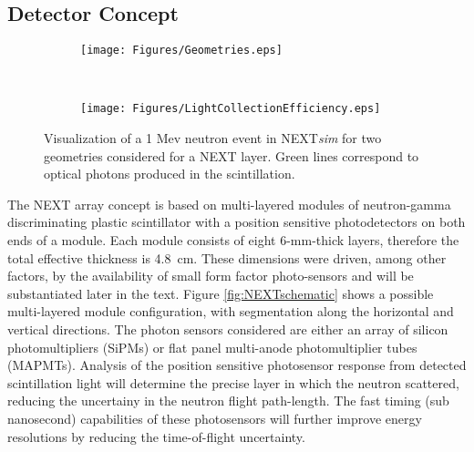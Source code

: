 \documentclass[preprint,3p,twocolumn]{elsarticle}
\begin{document}
\subsection{Detector Concept}
\begin{figure}[t]
 \centering
 \begin{subfigure}{\linewidth}
  \centering
  \texttt{[image: Figures/Geometries.eps]}
 \caption{}
 \end{subfigure}%
 \\
 \begin{subfigure}{\linewidth}
  \centering
  \texttt{[image: Figures/LightCollectionEfficiency.eps]}
  \caption{}
 \end{subfigure}%
 \caption{Visualization of a 1 Mev neutron event in NEXT\emph{sim} for two geometries considered for a NEXT layer. Green lines correspond to optical photons produced in the scintillation.}
 \label{fig:GeoEff}
\end{figure} 

The NEXT array concept is based on multi-layered modules of neutron-gamma discriminating plastic scintillator with a position sensitive photodetectors on both ends of a module. Each module consists of eight 6-mm-thick layers, therefore the total effective thickness is 4.8~cm. These dimensions were driven, among other factors, by the availability of small form factor photo-sensors and will be substantiated later in the text. Figure \ref{fig:NEXTschematic} shows a possible multi-layered module configuration, with segmentation along the horizontal and vertical directions. The photon sensors considered are either an array of silicon photomultipliers (SiPMs) or flat panel multi-anode photomultiplier tubes (MAPMTs). Analysis of the position sensitive photosensor response from detected scintillation light will determine the precise layer in which the neutron scattered, reducing the uncertainy in the neutron flight path-length. The fast timing (sub nanosecond) capabilities of these photosensors will further improve energy resolutions by reducing the time-of-flight uncertainty. 
\end{document}
